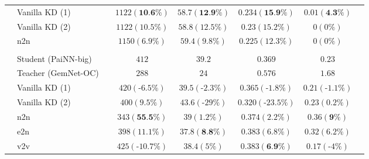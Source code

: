\documentclass{article}
\begin{document}
\begin{table}[H]
\begin{tabular}{llcccccc}
& Vanilla KD (1)             &   &            $1122 (\textbf{10.6\%})$          &          $58.7 (\textbf{12.9\%})$     &     $0.234 (\textbf{15.9\%})$        &  $0.01 (\textbf{4.3\%})$ \\
& Vanilla KD (2)               &   &            $1122 (10.5\%)$          &          $58.8 (12.5\%)$     &     $0.23 (15.2\%)$        &  $0 (0\%)$ &  \\
& n2n              &   &            $1150 (6.9\%)$          &          $59.4 (9.8\%)$     &     $0.225 (12.3\%)$        &  $0 (0\%)$  &  \\
\multicolumn{7}{c}{} \\
\parbox[t]{2mm}{} & Student (PaiNN-big)                  &   &              $412$        &   $39.2$     &   $0.369$      &   $0.23$    \\
& Teacher (GemNet-OC)                      &   &              $288$        &   $24$     &   $0.576$      &   $1.68$     \\
& Vanilla KD (1)           &   &            $420 (\text{-}6.5\%)$          &          $39.5 (\text{-}2.3\%)$     &     $0.365 (\text{-}1.8\%)$        &  $0.21 (\text{-}1.1\%)$    \\
& Vanilla KD (2)             &   &            $400 (9.5\%)$          &          $43.6 (\text{-}29\%)$     &     $0.320 (\text{-}23.5\%)$        &  $0.23 (0.2\%)$   \\
& n2n              &   &            $343 (\textbf{55.5\%})$          &          $39 (1.2\%)$     &     $0.374 (2.2\%)$        &  $0.36 (\textbf{9\%})$   \\
& e2n               &   &            $398 (11.1\%)$          &          $37.8 (\textbf{8.8\%})$     &     $0.383 (6.8\%)$        &  $0.32 (6.2\%)$     \\
& v2v              &   &            $425 (\text{-}10.7\%)$          &          $38.4 (5\%)$     &     $0.383 (\textbf{6.9\%})$        &  $0.17 (\text{-}4\%)$        
\end{tabular}
\label{tab:ood_cat_results}
\end{table}
\end{document}

